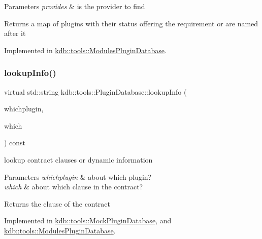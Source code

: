 \begin{DoxyParams}{Parameters}
{\em provides} & is the provider to find\\
\hline
\end{DoxyParams}
\begin{DoxyReturn}{Returns}
a map of plugins with their status offering the requirement or are named after it 
\end{DoxyReturn}


Implemented in \mbox{\hyperlink{classkdb_1_1tools_1_1ModulesPluginDatabase_abe19487ff2a2e0548288dfa2a5678ae1}{kdb\+::tools\+::\+Modules\+Plugin\+Database}}.

\mbox{\label{classkdb_1_1tools_1_1PluginDatabase_ac0af2ec31a98f4176c19eaf34977abbe}} 
\subsubsection{\texorpdfstring{lookupInfo()}{lookupInfo()}}
{\footnotesize\ttfamily virtual std\+::string kdb\+::tools\+::\+Plugin\+Database\+::lookup\+Info (\begin{DoxyParamCaption}\item[{\mbox{\hyperlink{classkdb_1_1tools_1_1PluginSpec}{Plugin\+Spec}} const \&}]{whichplugin,  }\item[{std\+::string const \&}]{which }\end{DoxyParamCaption}) const\hspace{0.3cm}{\ttfamily [pure virtual]}}



lookup contract clauses or dynamic information 


\begin{DoxyParams}{Parameters}
{\em whichplugin} & about which plugin? \\
\hline
{\em which} & about which clause in the contract?\\
\hline
\end{DoxyParams}
\begin{DoxyReturn}{Returns}
the clause of the contract 
\end{DoxyReturn}


Implemented in \mbox{\hyperlink{classkdb_1_1tools_1_1MockPluginDatabase_ae352c27aa51bc8c2ea8c708d14f6fc76}{kdb\+::tools\+::\+Mock\+Plugin\+Database}}, and \mbox{\hyperlink{classkdb_1_1tools_1_1ModulesPluginDatabase_a3f51beee8aecb4371e7d12e98958f875}{kdb\+::tools\+::\+Modules\+Plugin\+Database}}.

